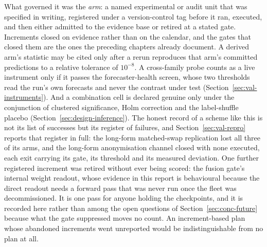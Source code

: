 What governed it was the \emph{arm}: a named experimental or audit unit that was
specified in writing, registered under a version-control tag before it ran,
executed, and then either admitted to the evidence base or retired at a stated
gate. Increments closed on evidence rather than on the calendar, and the gates
that closed them are the ones the preceding chapters already document. A derived
arm's statistic may be cited only after a rerun reproduces that arm's committed
predictions to a relative tolerance of $10^{-8}$. A cross-family probe counts as
a live instrument only if it passes the forecaster-health screen, whose two
thresholds read the run's own forecasts and never the contrast under test
(Section~\ref{sec:val-instruments}). And a combination cell is declared genuine
only under the conjunction of clustered significance, Holm correction and the
label-shuffle placebo (Section~\ref{sec:design-inference}). The honest record of
a scheme like this is not its list of successes but its register of failures,
and Section~\ref{sec:val-repro} reports that register in full: the long-form
matched-swap replication lost all three of its arms, and the long-form
anonymisation channel closed with none executed, each exit carrying its gate,
its threshold and its measured deviation. One further registered increment was
retired without ever being scored: the fusion gate's internal weight readout,
whose evidence in this report is behavioural because the direct readout needs a
forward pass that was never run once the fleet was decommissioned. It is one
pass for anyone holding the checkpoints, and it is recorded here rather than
among the open questions of Section~\ref{sec:conc-future} because what the gate
suppressed moves no count. %
An increment-based plan whose abandoned increments went unreported would be
indistinguishable from no plan at all.

